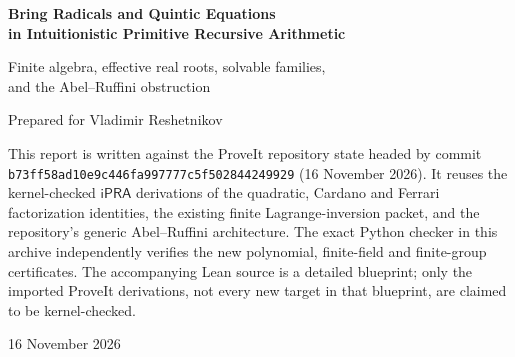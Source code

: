 \documentclass[11pt,oneside]{article}
\theoremstyle{definition}
\theoremstyle{remark}
\newcommand{\ipra}{\ensuremath{\mathsf{iPRA}}}
\newcommand{\code}[1]{\texttt{#1}}
\begin{document}
\begin{titlepage}
\centering
\vspace*{0.85in}
{\LARGE\bfseries Bring Radicals and Quintic Equations\\[0.35em]
in Intuitionistic Primitive Recursive Arithmetic\par}
\vspace{0.7in}
{\large Finite algebra, effective real roots, solvable families,\\
and the Abel--Ruffini obstruction\par}
\vspace{0.7in}
{\large Prepared for Vladimir Reshetnikov\par}
\vfill
\begin{minipage}{0.91\textwidth}
\small
This report is written against the ProveIt repository state headed by commit
\code{b73ff58ad10e9c446fa997777c5f502844249929} (16 November 2026).
It reuses the kernel-checked \ipra{} derivations of the quadratic, Cardano and
Ferrari factorization identities, the existing finite Lagrange-inversion
packet, and the repository's generic Abel--Ruffini architecture.  The exact
Python checker in this archive independently verifies the new polynomial,
finite-field and finite-group certificates.  The accompanying Lean source is a
detailed blueprint; only the imported ProveIt derivations, not every new target
in that blueprint, are claimed to be kernel-checked.
\end{minipage}
\vspace{0.55in}
{\large 16 November 2026\par}
\end{titlepage}

\end{document}
